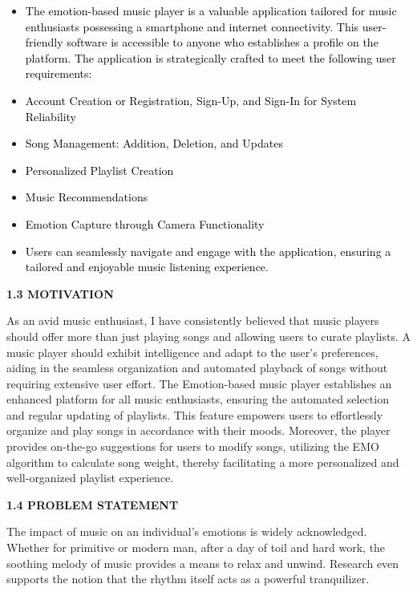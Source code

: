 \documentclass[a4paper]{article}
\newcommand\liststyleWWNumii{%
\renewcommand\labelitemi{${\bullet}$}
\renewcommand\labelitemii{o}
\renewcommand\labelitemiii{${\blacksquare}$}
\renewcommand\labelitemiv{${\bullet}$}
}
\begin{document}
\liststyleWWNumii
\begin{itemize}
\item \textcolor{black}{The emotion-based music player is a valuable application tailored for music enthusiasts
possessing a smartphone and internet connectivity. This user-friendly software is accessible to anyone who establishes
a profile on the platform. The application is strategically crafted to meet the following user requirements:}
\item \textcolor{black}{Account Creation or Registration, Sign-Up, and Sign-In for System Reliability}
\item \textcolor{black}{Song Management: Addition, Deletion, and Updates}
\item \textcolor{black}{Personalized Playlist Creation}
\item \textcolor{black}{Music Recommendations}
\item \textcolor{black}{Emotion Capture through Camera Functionality}
\item \textcolor{black}{Users can seamlessly navigate and engage with the application, ensuring a tailored and enjoyable
music listening experience.}
\end{itemize}
{\bfseries
\hypertarget{3znysh7}{}1.3 MOTIVATION}

As an avid music enthusiast, I have consistently believed that music players should offer more than just playing songs
and allowing users to curate playlists. A music player should exhibit intelligence and adapt to the user's preferences,
aiding in the seamless organization and automated playback of songs without requiring extensive user effort. The
Emotion-based music player establishes an enhanced platform for all music enthusiasts, ensuring the automated selection
and regular updating of playlists. This feature empowers users to effortlessly organize and play songs in accordance
with their moods. Moreover, the player provides on-the-go suggestions for users to modify songs, utilizing the EMO
algorithm to calculate song weight, thereby facilitating a more personalized and well-organized playlist experience.


\bigskip

{\bfseries
\hypertarget{2et92p0}{}1.4 PROBLEM STATEMENT }

The impact of music on an individual's emotions is widely acknowledged. Whether for primitive or modern man, after a day
of toil and hard work, the soothing melody of music provides a means to relax and unwind. Research even supports the
notion that the rhythm itself acts as a powerful tranquilizer.
\end{document}
